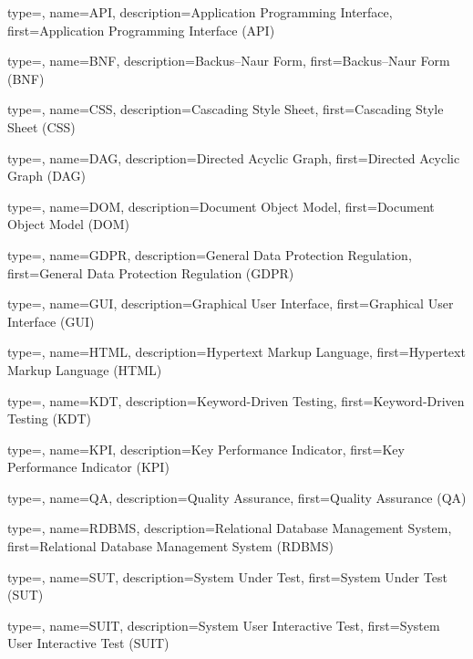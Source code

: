 
{
	type=\acronymtype,
	name={API},
	description={Application Programming Interface},
	first={Application Programming Interface (API)}
}

{
	type=\acronymtype,
	name={BNF},
	description={Backus–Naur Form},
	first={Backus–Naur Form (BNF)}
}

{
	type=\acronymtype,
	name={CSS},
	description={Cascading Style Sheet},
	first={Cascading Style Sheet (CSS)}
}

{
	type=\acronymtype,
	name={DAG},
	description={Directed Acyclic Graph},
	first={Directed Acyclic Graph (DAG)}
}

{
	type=\acronymtype,
	name={DOM},
	description={Document Object Model},
	first={Document Object Model (DOM)}
}

{
	type=\acronymtype,
	name={GDPR},
	description={General Data Protection Regulation},
	first={General Data Protection Regulation (GDPR)}
}

{
	type=\acronymtype,
	name={GUI},
	description={Graphical User Interface},
	first={Graphical User Interface (GUI)}
}



{
	type=\acronymtype,
	name={HTML},
	description={Hypertext Markup Language},
	first={Hypertext Markup Language (HTML)}
}

{
	type=\acronymtype,
	name={KDT},
	description={Keyword-Driven Testing},
	first={Keyword-Driven Testing (KDT)}
}

{
	type=\acronymtype,
	name={KPI},
	description={Key Performance Indicator},
	first={Key Performance Indicator (KPI)}
}

{
	type=\acronymtype,
	name={QA},
	description={Quality Assurance},
	first={Quality Assurance (QA)}
}

{
	type=\acronymtype,
	name={RDBMS},
	description={Relational Database Management System},
	first={Relational Database Management System (RDBMS)}
}


{
	type=\acronymtype,
	name={SUT},
	description={System Under Test},
	first={System Under Test (SUT)}
}

{
	type=\acronymtype,
	name={SUIT},
	description={System User Interactive Test},
	first={System User Interactive Test (SUIT)}
}

